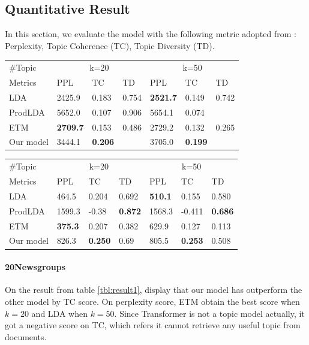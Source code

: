 \subsection{Quantitative Result}
In this section, we evaluate the model with the following metric adopted from \cite{dieng_dynamic_2019}: Perplexity, Topic Coherence (TC), Topic Diversity (TD). %
\begin{table}[h]
\centering
\begin{tabular}{lllllll}
\hline
\#Topic     & \multicolumn{3}{c}{k=20} & \multicolumn{3}{c}{k=50} \\
Metrics     & PPL      & TC      & TD  & PPL      & TC      & TD  \\
\hline
LDA         & 2425.9   & 0.183   &  0.754   & \textbf{2521.7}   & 0.149   & 0.742    \\
ProdLDA     & 5652.0   & 0.107   &   0.906  & 5654.1   & 0.074   &     \\
ETM         & \textbf{2709.7}   & 0.153   &  0.486   & 2729.2   & 0.132   & 0.265    \\
Our model   & 3444.1   & \textbf{0.206}   &     & 3705.0   & \textbf{0.199}   &    \\
\hline
\end{tabular}
\end{table}
\begin{table}[h]
\centering
\begin{tabular}{lllllll}
\hline
\#Topic     & \multicolumn{3}{c}{k=20} & \multicolumn{3}{c}{k=50} \\
Metrics     & PPL     & TC     & TD    & PPL     & TC     & TD    \\ \hline
LDA         & 464.5   & 0.204  & 0.692 & \textbf{510.1}   & 0.155  &  0.580     \\
ProdLDA     & 1599.3  & -0.38  & \textbf{0.872} & 1568.3  & -0.411 & \textbf{0.686} \\
ETM         & \textbf{375.3}   & 0.207  & 0.382 & 629.9   & 0.127  & 0.113 \\
Our model   & 826.3   & \textbf{0.250}  & 0.69  & 805.5   & \textbf{0.253}  & 0.508 \\ \hline
\end{tabular}
\end{table}
\paragraph{20Newsgroups}On the result from table \ref{tbl:result1}, display that our model has outperform the other model by TC score. On perplexity score, ETM obtain the best score when $ k=20 $ and LDA when $ k=50 $. Since Transformer is not a topic model actually, it got a negative score on TC, which refers it cannot retrieve any useful topic from documents.
